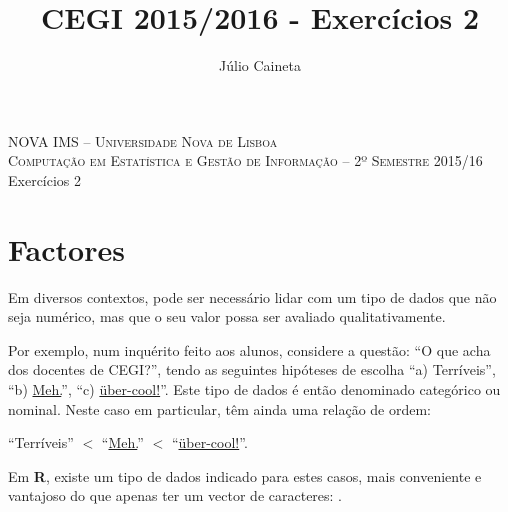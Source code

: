 \documentclass{exam}
\author{Júlio Caineta}
\title{CEGI 2015/2016 - Exercícios 2}
\begin{document}
 
\begin{center}
	\textsc {\small NOVA IMS -- Universidade Nova de Lisboa} \\
	\textsc {Computação em Estatística e Gestão de Informação -- 2º Semestre 2015/16}
	\vspace{5mm} \\
	{\large Exercícios 2}
\end{center}
 
\vspace{5mm}

\section{Factores}

Em diversos contextos, pode ser necessário lidar com um tipo de dados que não seja numérico, mas que o seu valor possa ser avaliado qualitativamente.

Por exemplo, num inquérito feito aos alunos, considere a questão: ``O que acha dos docentes de CEGI?'', tendo as seguintes hipóteses de escolha ``a) Terríveis'', ``b) \href{http://www.urbandictionary.com/define.php?term=Meh}{Meh.}'', ``c) \href{http://www.urbandictionary.com/define.php?term=uber-cool}{über-cool!}''. Este tipo de dados é então denominado categórico ou nominal.
Neste caso em particular, têm ainda uma relação de ordem: 

\begin{center}
	``Terríveis'' $<$ ``\href{http://www.urbandictionary.com/define.php?term=Meh}{Meh.}'' $<$ ``\href{http://www.urbandictionary.com/define.php?term=uber-cool}{über-cool!}''.
\end{center}

Em \textbf{R}, existe um tipo de dados indicado para estes casos, mais conveniente e vantajoso do que apenas ter um vector de caracteres: .
 
\end{document}
